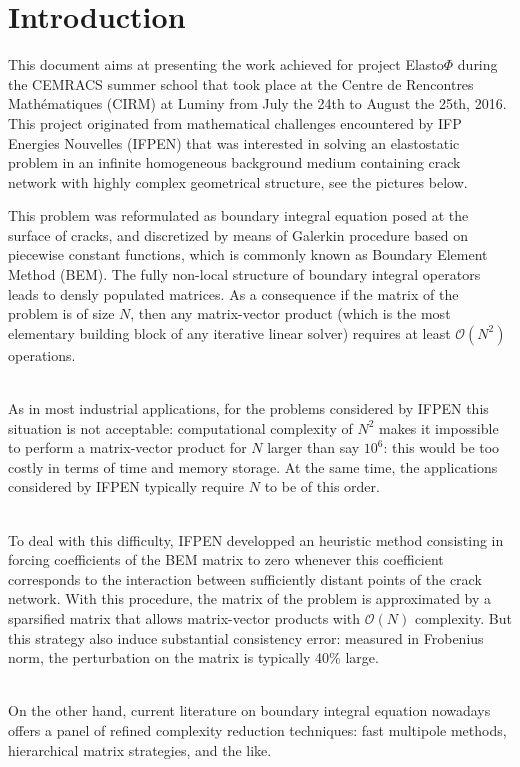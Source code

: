 \section*{Introduction}

This document aims at presenting the work achieved for project Elasto$\Phi$ during the CEMRACS summer school  
that took place at the Centre de Rencontres Mathématiques (CIRM) at Luminy from  July the 24th to 
August the 25th, 2016. This project originated from mathematical challenges encountered by IFP Energies Nouvelles (IFPEN)
that was interested in solving an elastostatic problem in an infinite homogeneous background medium containing crack 
network with highly complex geometrical structure, see the pictures below. 

\begin{figure}[h!]
\end{figure}


\noindent 
This problem was reformulated as boundary integral equation posed at the surface of cracks, and 
discretized by means of Galerkin procedure based on piecewise constant functions, which is commonly known as 
Boundary Element Method (BEM). The fully non-local structure of boundary integral operators leads to  
densly populated matrices. As a consequence if the matrix of the problem is of size $N$, 
then any matrix-vector product (which is the most elementary building block of any iterative linear solver)
requires at least $\mathcal{O}(N^{2})$ operations.

\quad\\
As in most industrial applications, for the problems considered by IFPEN this situation is not acceptable: 
computational complexity of $N^{2}$ makes it impossible to perform a matrix-vector product for $N$ larger than
say $10^{6}$: this would be too costly in terms of time and memory storage. At the same time, the  applications 
considered by IFPEN typically require $N$ to be of this order.

\quad\\
To deal with this difficulty, IFPEN developped  an heuristic method consisting in forcing coefficients of the 
BEM matrix to zero whenever this coefficient corresponds to the interaction between sufficiently distant points 
of the crack network. With this procedure, the matrix of the problem is approximated by a sparsified matrix that 
allows matrix-vector products with $\mathcal{O}(N)$ complexity. But this strategy also induce substantial consistency 
error: measured in Frobenius norm, the perturbation on the matrix is typically  40\% large.

\quad\\
On the other hand, current literature on boundary integral equation nowadays offers a panel of refined 
complexity reduction techniques: fast multipole methods, hierarchical matrix strategies, and the like.   












